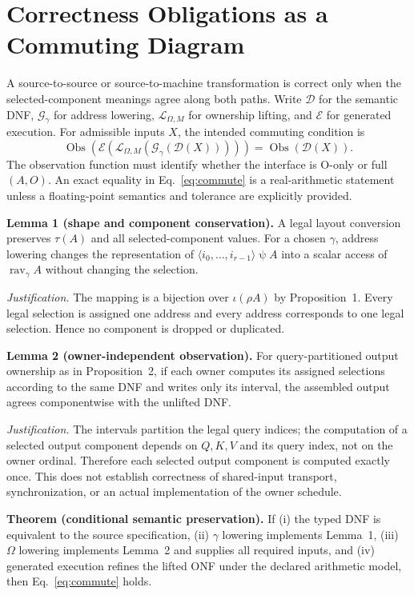\documentclass[sigplan,10pt,review,anonymous,balance=false,pbalance=false]{acmart}
\newcommand{\ps}{\mathbin{\psi}}
\newcommand{\rav}{\operatorname{rav}}
\begin{document}
\section{Correctness Obligations as a Commuting Diagram}
A source-to-source or source-to-machine transformation is correct only when the selected-component meanings agree along both paths. Write $\mathcal D$ for the semantic DNF, $\mathcal G_\gamma$ for address lowering, $\mathcal L_{\Omega,M}$ for ownership lifting, and $\mathcal E$ for generated execution. For admissible inputs $X$, the intended commuting condition is
\begin{equation}
 \operatorname{Obs}(\mathcal E(\mathcal L_{\Omega,M}(\mathcal G_\gamma(\mathcal D(X)))))
 =\operatorname{Obs}(\mathcal D(X)).\label{eq:commute}
\end{equation}
The observation function must identify whether the interface is O-only or full $(A,O)$. An exact equality in Eq.~\eqref{eq:commute} is a real-arithmetic statement unless a floating-point semantics and tolerance are explicitly provided.

\textbf{Lemma 1 (shape and component conservation).} A legal layout conversion preserves $\tau(A)$ and all selected-component values. For a chosen $\gamma$, address lowering changes the representation of $\langle i_0,\ldots,i_{r-1}\rangle\ps A$ into a scalar access of $\rav_\gamma A$ without changing the selection.

\emph{Justification.} The mapping is a bijection over $\iota(\rho A)$ by Proposition~1. Every legal selection is assigned one address and every address corresponds to one legal selection. Hence no component is dropped or duplicated.

\textbf{Lemma 2 (owner-independent observation).} For query-partitioned output ownership as in Proposition~2, if each owner computes its assigned selections according to the same DNF and writes only its interval, the assembled output agrees componentwise with the unlifted DNF.

\emph{Justification.} The intervals partition the legal query indices; the computation of a selected output component depends on $Q,K,V$ and its query index, not on the owner ordinal. Therefore each selected output component is computed exactly once. This does not establish correctness of shared-input transport, synchronization, or an actual implementation of the owner schedule.

\textbf{Theorem (conditional semantic preservation).} If (i) the typed DNF is equivalent to the source specification, (ii) $\gamma$ lowering implements Lemma~1, (iii) $\Omega$ lowering implements Lemma~2 and supplies all required inputs, and (iv) generated execution refines the lifted ONF under the declared arithmetic model, then Eq.~\eqref{eq:commute} holds.
\end{document}

